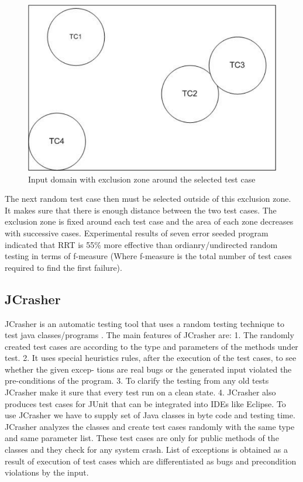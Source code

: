 \begin{figure}[h]
	\centering
	\includegraphics[scale=0.5]{Literature/RRT}
	\caption{Input domain with exclusion zone around the selected test case}
\end{figure}

The next random test case then must be selected outside of this exclusion zone. It makes sure that there is enough distance between the two test cases. The exclusion zone is fixed around each test case and the area of each zone decreases with successive cases.
Experimental results of seven error seeded program indicated that RRT is 55\% more effective than ordianry/undirected random testing in terms of f-measure (Where f-measure is the total number of test cases required to find the first failure).


\subsection{JCrasher}
JCrasher is an automatic testing tool that uses a random testing technique to test java classes/programs \cite{Pacheco2007b}. The main features of JCrasher are:
1. The randomly created test cases are according to the type and parameters of the methods under test.
2. It uses special heuristics rules, after the execution of the test cases, to see whether the given excep- tions are real bugs or the generated input violated the pre-conditions of the program.
3. To clarify the testing from any old tests JCrasher make it sure that every test run on a clean state.
4. JCrasher also produces test cases for JUnit that can be integrated into IDEs like Eclipse.
To use JCrasher we have to supply set of Java classes in byte code and testing time. JCrasher analyzes the classes and create test cases randomly with the same type and same parameter list. These test cases are only for public methods of the classes and they check for any system crash. List of exceptions is obtained as a result of execution of test cases which are differentiated as bugs and precondition violations by the input.

